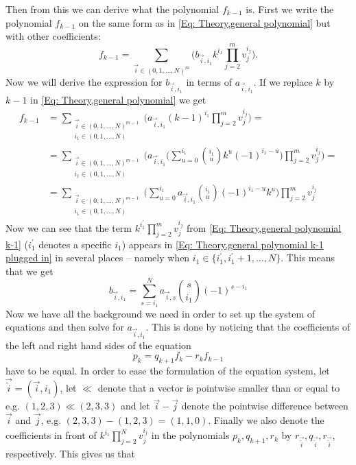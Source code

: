 Then from this we can derive what the polynomial $f_{k-1}$ is. First we write the polynomial $f_{k-1}$ on the same form as in \eqref{Eq: Theory,general polynomial} but with other coefficients:
\begin{equation}\label{Eq: Theory,general polynomial k-1}
  f_{k-1} = \sum_{\vec{i}\in (0,1,\ldots,N)^m} \Big(b_{\vec{i},i_1}k^{i_1}\prod_{j=2}^m v_j^{i_j}\Big).
\end{equation}
Now we will derive the expression for $b_{\vec{i},i_1}$ in terms of $a_{\vec{i},i_1}$. If we replace $k$ by $k-1$ in \eqref{Eq: Theory,general polynomial} we get
\begin{equation}\label{Eq: Theory,general polynomial k-1 plugged in}
  \begin{split}
    f_{k-1} & = \sum_{\substack{\vec{i}\in (0,1,\ldots,N)^{m-1}\\i_1\in (0,1,\ldots,N)}} \Big(a_{\vec{i},i_1}(k-1)^{i_1}\prod_{j=2}^m v_j^{i_j}\Big) = \\
    & = \sum_{\substack{\vec{i}\in (0,1,\ldots,N)^{m-1}\\i_1\in (0,1,\ldots,N)}} \Big(a_{\vec{i},i_1}\Bigg(\sum_{u=0}^{i_1} \binom{i_1}{u}k^u (-1)^{i_1-u}\Bigg)\prod_{j=2}^m v_j^{i_j}\Big) = \\
    & = \sum_{\substack{\vec{i}\in (0,1,\ldots,N)^{m-1}\\i_1\in (0,1,\ldots,N)}} \Bigg(\sum_{u=0}^{i_1} a_{\vec{i},i_1}\binom{i_1}{u}(-1)^{i_1-u}k^u\Bigg) \prod_{j=2}^m v_j^{i_j}
  \end{split}
\end{equation}
Now we can see that the term $k^{i_1^\prime}\prod_{j=2}^m v_j^{i_j}$ from \eqref{Eq: Theory,general polynomial k-1} ($i_1^\prime$ denotes a specific $i_1$) appears in \eqref{Eq: Theory,general polynomial k-1 plugged in} in several places -- namely when $i_1\in\{i_1^\prime,i_1^\prime+1,\ldots,N\}$. This means that we get
\begin{equation}\label{Eq: Theory,fk-1 coefficients}
  b_{\vec{i},i_1} = \sum_{s=i_1}^N a_{\vec{i},s}\binom{s}{i_1}(-1)^{s-i_1}
\end{equation}
Now we have all the background we need in order to set up the system of equations and then solve for $a_{\vec{i},i_1}$. This is done by noticing that the coefficients of the left and right hand sides of the equation
\begin{equation}\label{Eq: Theory,f equation}
  p_k=q_{k+1}f_k - r_k f_{k-1}
\end{equation}
have to be equal. In order to ease the formulation of the equation system, let $\vec{\hat{i}}=(\vec{i},i_1)$, let $\ll$ denote that a vector is pointwise smaller than or equal to e.g. $(1,2,3)\ll(2,3,3)$ and let $\vec{i}-\vec{j}$ denote the pointwise difference between $\vec{i}$ and $\vec{j}$, e.g. $(2,3,3)-(1,2,3)=(1,1,0)$. Finally we also denote the coefficients in front of $k^{i_1}\prod_{j=2}^N v_j^{i_j}$ in the polynomials $p_k, q_{k+1}, r_k$ by $r_\vec{\hat{i}}, q_\vec{\hat{i}}, r_\vec{\hat{i}}$, respectively. This gives us that
